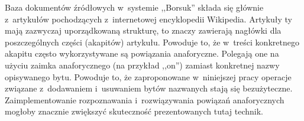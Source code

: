 \documentclass[a4paper, twoside, openright, 12pt]{report}
\begin{document}
    Baza dokumentów źródłowych w~systemie ,,Borsuk'' składa się głównie z~artykułów pochodzących z~internetowej encyklopedii
    Wikipedia. Artykuły ty mają zazwyczaj uporządkowaną strukturę, to znaczy zawierają nagłówki dla poszczególnych
    części (akapitów) artykułu. Powoduje to, że w~treści konkretnego akapitu często wykorzystywane są powiązania anaforyczne.
    Polegają one na użyciu zaimka anaforycznego (na przykład ,,on'') zamiast konkretnej nazwy opisywanego bytu. Powoduje
    to, że zaproponowane w~niniejszej pracy operacje związane z~dodawaniem i~usuwaniem bytów nazwanych stają się bezużyteczne.
    Zaimplementowanie rozpoznawania i~rozwiązywania powiązań anaforycznych mogłoby znacznie zwiększyć skuteczność
    prezentowanych tutaj technik.


\clearpage
{}


\end{document}
